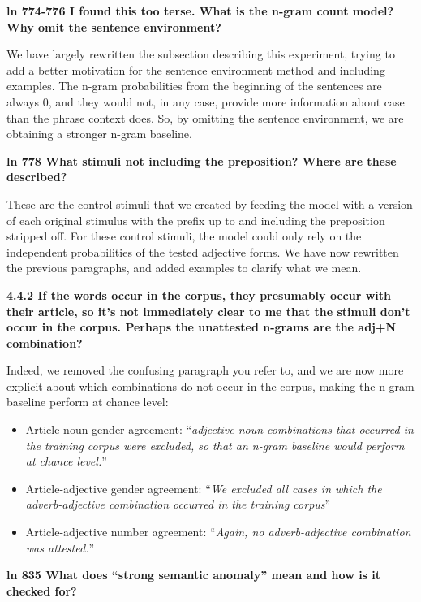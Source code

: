 \documentclass{article}[11pt,a4paper,oneside]
\begin{document}
\textbf{ln 774-776 I found this too terse. What is the n-gram count model? Why omit the sentence environment?}

We have largely rewritten the subsection describing this experiment, trying to add a better motivation for the sentence environment method and including examples. The n-gram probabilities from the beginning of the sentences are always 0, and they would not, in any case, provide more information about case than the phrase context does. So, by omitting the sentence environment, we are obtaining a stronger n-gram baseline.
\newline

\textbf{ln 778 What stimuli not including the preposition? Where are these described?}

These are the control stimuli that we created by feeding the model with a version of each original stimulus with the prefix up to and including the preposition stripped off. For these control stimuli, the model could only rely on the independent probabilities of the tested adjective forms. We have now rewritten the previous paragraphs, and added examples to clarify what we mean.
\newline

\textbf{4.4.2 If the words occur in the corpus, they presumably occur with their article, so it's not immediately clear to me that the stimuli don't occur in the corpus. Perhaps the unattested n-grams are the adj+N combination?}

Indeed, we removed the confusing paragraph you refer to, and we are now more explicit about which combinations do not occur in the corpus, making the n-gram baseline perform at chance level:
\begin{itemize}
\item Article-noun gender agreement: ``\textit{adjective-noun combinations that occurred in the training corpus were excluded, so that an n-gram baseline would perform at chance level.}''
\item Article-adjective gender agreement: ``\textit{We excluded all cases in which the adverb-adjective combination occurred in the training corpus}''
\item Article-adjective number agreement: ``\textit{Again, no adverb-adjective combination was attested.}''\newline
\end{itemize}

\textbf{ln 835 What does ``strong semantic anomaly'' mean and how is it checked for?}
\end{document}
